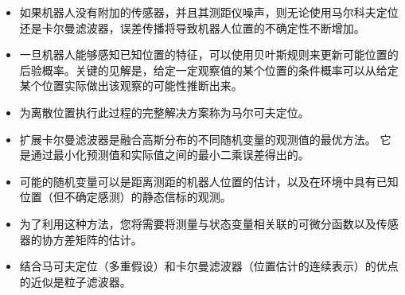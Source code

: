 \begin{itemize}
\item 如果机器人没有附加的传感器，并且其测距仪噪声，则无论使用马尔科夫定位还是卡尔曼滤波器，误差传播将导致机器人位置的不确定性不断增加。
\item 一旦机器人能够感知已知位置的特征，可以使用贝叶斯规则来更新可能位置的后验概率。关键的见解是，给定一定观察值的某个位置的条件概率可以从给定某个位置实际做出该观察的可能性推断出来。
\item 为离散位置执行此过程的完整解决方案称为马尔可夫定位。
\item 扩展卡尔曼滤波器是融合高斯分布的不同随机变量的观测值的最优方法。
它是通过最小化预测值和实际值之间的最小二乘误差得出的。
\item 可能的随机变量可以是距离测距的机器人位置的估计，以及在环境中具有已知位置（但不确定感测）的静态信标的观测。
\item 为了利用这种方法，您将需要将测量与状态变量相关联的可微分函数以及传感器的协方差矩阵的估计。
\item 结合马可夫定位（多重假设）和卡尔曼滤波器（位置估计的连续表示）的优点的近似是粒子滤波器。
\end{itemize}

